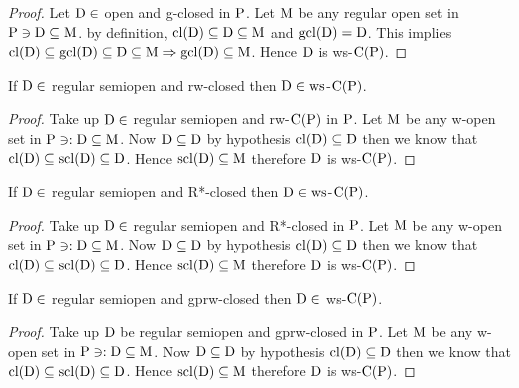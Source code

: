 \begin{proof}
Let $\mathrm{D}\in$ open and g-closed in $\mathrm{P}$. Let $\mathrm{M}$ be any regular open set in $\mathrm{P}\ni \mathrm{D}\subseteq \mathrm{M}$. by definition, $\mathrm{cl}(\mathrm{D})\subseteq \mathrm{D}\subseteq \mathrm{M}$ and $\mathrm{gcl}(\mathrm{D})=\mathrm{D}$. This implies $\mathrm{cl}(\mathrm{D})\subseteq \mathrm{gcl}(\mathrm{D}) \subseteq \mathrm{D}\subseteq \mathrm{M}\Rightarrow\mathrm{gcl}(\mathrm{D})\subseteq \mathrm{M}$. Hence $\mathrm{D}$ is ws-$\mathrm{C}(\mathrm{P})$.
\end{proof}

\begin{thm}\label{thm2.1.22}
If $\mathrm{D}\in$ regular semiopen and rw-closed then $\mathrm{D}\in\mathrm{ws}$-$\mathrm{C}(\mathrm{P})$.
\end{thm}

\begin{proof}
Take up $\mathrm{D}\in$ regular semiopen and rw-$\mathrm{C}(\mathrm{P})$ in $\mathrm{P}$. Let $\mathrm{M}$ be any w-open set in $\mathrm{P}\ni: \mathrm{D}\subseteq \mathrm{M}$. Now $\mathrm{D}\subseteq \mathrm{D}$ by hypothesis $\mathrm{cl}(\mathrm{D})\subseteq \mathrm{D}$ then we know that $\mathrm{cl}(\mathrm{D}) \subseteq \mathrm{scl}(\mathrm{D})\subseteq \mathrm{D}$. Hence $\mathrm{scl}(\mathrm{D})\subseteq \mathrm{M}$ therefore $\mathrm{D}$ is ws-$\mathrm{C}(\mathrm{P})$.
\end{proof}

\begin{thm}\label{thm2.1.23}
If $\mathrm{D}\in$ regular semiopen and R*-closed then $\mathrm{D}\in\mathrm{ws}$-$\mathrm{C}(\mathrm{P})$.
\end{thm}

\begin{proof}
Take up $\mathrm{D}\in$ regular semiopen and R*-closed in $\mathrm{P}$. Let $\mathrm{M}$ be any w-open set in $\mathrm{P} \ni:\mathrm{D}\subseteq \mathrm{M}$. Now $\mathrm{D}\subseteq \mathrm{D}$ by hypothesis $\mathrm{cl}(\mathrm{D})\subseteq \mathrm{D}$ then we know that $\mathrm{cl}(\mathrm{D}) \subseteq \mathrm{scl}(\mathrm{D})\subseteq \mathrm{D}$. Hence $\mathrm{scl}(\mathrm{D})\subseteq \mathrm{M}$ therefore $\mathrm{D}$ is ws-$\mathrm{C}(\mathrm{P})$.
\end{proof}

\begin{thm}\label{thm2.1.24}
If $\mathrm{D}\in$ regular semiopen and gprw-closed then $\mathrm{D}\in$ ws-$\mathrm{C}(\mathrm{P})$.
\end{thm}

\begin{proof}
Take up $\mathrm{D}$ be regular semiopen and gprw-closed in $\mathrm{P}$. Let $\mathrm{M}$ be any w-open set in $\mathrm{P}\ni : \mathrm{D}\subseteq \mathrm{M}$. Now $\mathrm{D}\subseteq \mathrm{D}$ by hypothesis $\mathrm{cl}(\mathrm{D})\subseteq \mathrm{D}$ then we know that $\mathrm{cl}(\mathrm{D}) \subseteq \mathrm{scl}(\mathrm{D})\subseteq \mathrm{D}$. Hence $\mathrm{scl}(\mathrm{D})\subseteq \mathrm{M}$ therefore $\mathrm{D}$ is ws-$\mathrm{C}(\mathrm{P})$.
\end{proof}

